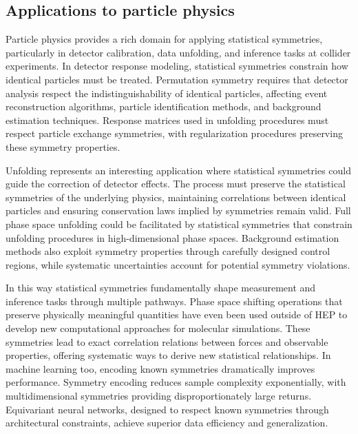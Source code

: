     \subsection{Applications to particle physics}
        Particle physics provides a rich domain for applying statistical symmetries, particularly in detector calibration, data unfolding, and inference tasks at collider experiments.
        In detector response modeling, statistical symmetries constrain how identical particles must be treated. 
        Permutation symmetry requires that detector analysis respect the indistinguishability of identical particles, affecting event reconstruction algorithms, particle identification methods, and background estimation techniques. 
        Response matrices used in unfolding procedures must respect particle exchange symmetries, with regularization procedures preserving these symmetry properties.

        Unfolding represents an interesting application where statistical symmetries could guide the correction of detector effects.
        The process must preserve the statistical symmetries of the underlying physics, maintaining correlations between identical particles and ensuring conservation laws implied by symmetries remain valid.
        Full phase space unfolding could be facilitated by statistical symmetries that constrain unfolding procedures in high-dimensional phase spaces.
        Background estimation methods also exploit symmetry properties through carefully designed control regions, while systematic uncertainties account for potential symmetry violations.

        In this way statistical symmetries fundamentally shape measurement and inference tasks through multiple pathways.
        Phase space shifting operations that preserve physically meaningful quantities have even been used outside of HEP to develop new computational approaches for molecular simulations.
        These symmetries lead to exact correlation relations between forces and observable properties, offering systematic ways to derive new statistical relationships.
        In machine learning too, encoding known symmetries dramatically improves performance.
        Symmetry encoding reduces sample complexity exponentially, with multidimensional symmetries providing disproportionately large returns.
        Equivariant neural networks, designed to respect known symmetries through architectural constraints, achieve superior data efficiency and generalization.

